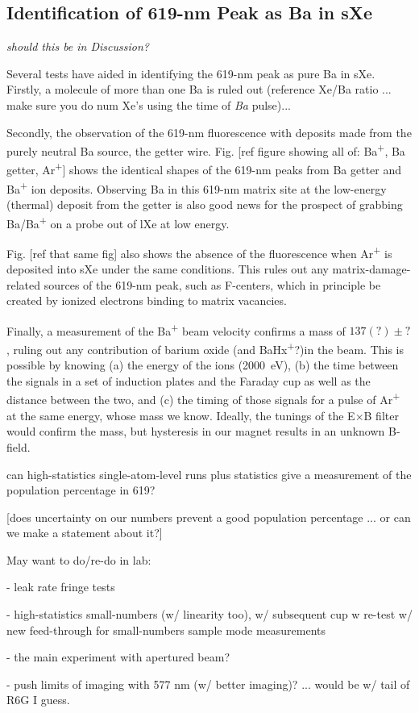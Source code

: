 \documentclass[aps,pra,reprint,superscriptaddress]{revtex4-1}
\begin{document}
\subsection{Identification of 619-nm Peak as Ba in sXe}

{\color{red}\emph{should this be in Discussion?}}

Several tests have aided in identifying the 619-nm peak as pure Ba in sXe.  Firstly, a molecule of more than one Ba is ruled out {\color{red}(reference Xe/Ba ratio ... make sure you do num Xe's using the time of \emph{Ba} pulse)}...

Secondly, the observation of the 619-nm fluorescence with deposits made from the purely neutral Ba source, the getter wire.  Fig. [ref figure showing all of: Ba\textsuperscript{+}, Ba getter, Ar\textsuperscript{+}] shows the identical shapes of the 619-nm peaks from Ba getter and Ba\textsuperscript{+} ion deposits.  Observing Ba in this 619-nm matrix site at the low-energy (thermal) deposit from the getter is also good news for the prospect of grabbing Ba/Ba\textsuperscript{+} on a probe out of lXe at low energy.

Fig. [ref that same fig] also shows the absence of the fluorescence when Ar\textsuperscript{+} is deposited into sXe under the same conditions.  This rules out any matrix-damage-related sources of the 619-nm peak, such as F-centers, which in principle be created by ionized electrons binding to matrix vacancies.  

Finally, a measurement of the Ba\textsuperscript{+} beam velocity confirms a mass of $137(?) \pm ?$, ruling out any contribution of barium oxide {\color{red}(and BaHx\textsuperscript{+}?)}in the beam.  This is possible by knowing (a) the energy of the ions (2000~eV), (b) the time between the signals in a set of induction plates and the Faraday cup as well as the distance between the two, and (c) the timing of those signals for a pulse of Ar\textsuperscript{+} at the same energy, whose mass we know.  Ideally, the tunings of the E$\times$B filter would confirm the mass, but hysteresis in our magnet results in an unknown B-field.

{\color{gray}can high-statistics single-atom-level runs plus statistics give a measurement of the population percentage in 619?

[does uncertainty on our numbers prevent a good population percentage ... or can we make a statement about it?]}

\noindent
{\color{blue}May want to do/re-do in lab:

- leak rate fringe tests

- high-statistics small-numbers (w/ linearity too), w/ subsequent cup w re-test w/ new feed-through for small-numbers sample mode measurements

- the main experiment with apertured beam?

- push limits of imaging with 577 nm (w/ better imaging)? ... would be w/ tail of R6G I guess.}
\end{document}

